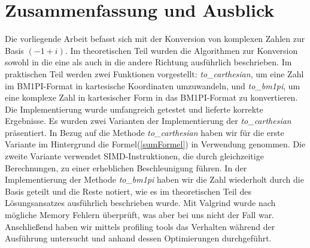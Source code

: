 \documentclass[course=erap]{aspdoc}
\begin{document}
    \section{Zusammenfassung und Ausblick}
    Die vorliegende Arbeit befasst sich mit der Konversion von komplexen Zahlen zur Basis $(-1 + i)$.
    Im theoretischen Teil wurden die Algorithmen zur Konversion sowohl in die eine als auch in die andere Richtung ausführlich beschrieben. \newline
    Im praktischen Teil werden zwei Funktionen vorgestellt: \textit{to\_carthesian}, um eine Zahl im BM1PI-Format in kartesische Koordinaten umzuwandeln, und \textit{to\_bm1pi}, um eine komplexe Zahl in kartesischer Form in das BM1PI-Format zu konvertieren.
    Die Implementierung wurde umfangreich getestet und lieferte korrekte Ergebnisse.
    Es wurden zwei Varianten der Implementierung der \textit{to\_carthesian} präsentiert.
    In Bezug auf die Methode \textit{to\_carthesian} haben wir für die erste Variante im Hintergrund die Formel(\ref{sumFormel}) in Verwendung genommen.
    Die zweite Variante verwendet SIMD-Instruktionen, die durch gleichzeitige Berechnungen, zu einer erheblichen Beschleunigung führen. \newline
    In der Implementierung der Methode \textit{to\_bm1pi} haben wir die Zahl wiederholt durch die Basis geteilt und die Reste notiert, wie es im theoretischen Teil des Lösungsansatzes ausführlich beschrieben wurde.
    Mit Valgrind wurde nach mögliche Memory Fehlern überprüft, was aber bei uns nicht der Fall war.
    Anschließend haben wir mittels profiling tools das Verhalten während der Ausführung untersucht und anhand dessen Optimierungen durchgeführt.


    
    
\end{document}
